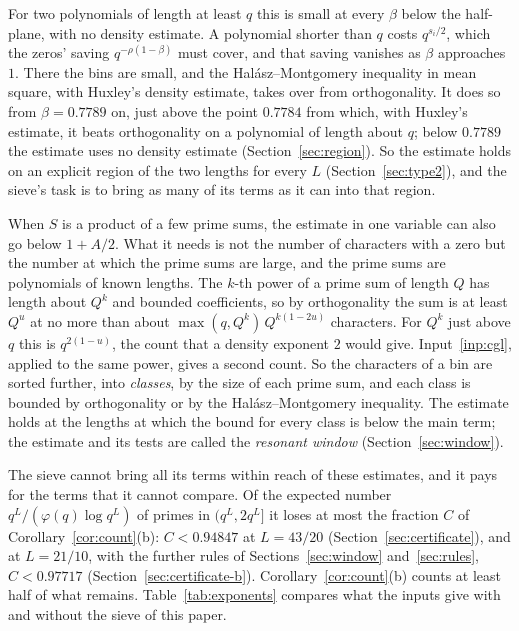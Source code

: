 \documentclass[11pt]{article}
\theoremstyle{definition}
\begin{document}
For two polynomials of length at least $q$ this is small at every $\beta$ below the half-plane, with no density
estimate. A polynomial shorter than $q$ costs $q^{s_i/2}$, which the zeros' saving $q^{-\rho(1 - \beta)}$ must cover,
and that saving vanishes as $\beta$ approaches $1$. There the bins are small, and the Hal\'asz--Montgomery inequality
in mean square, with Huxley's density estimate, takes over from orthogonality. It does so from $\beta = 0.7789$ on, just
above the point $0.7784$ from which, with Huxley's estimate, it beats orthogonality on a polynomial of length about
$q$; below $0.7789$ the estimate uses no density estimate (Section~\ref{sec:region}).
So the estimate holds on an explicit region of the two lengths for every $L$ (Section~\ref{sec:type2}), and the
sieve's task is to bring as many of its terms as it can into that region.

When $S$ is a product of a few prime sums, the estimate in one variable can also go below $1 + A/2$. What it needs is
not the number of characters with a zero but the number at which the prime sums are large, and the prime sums are
polynomials of known lengths. The $k$-th power of a prime sum of length $Q$ has length about $Q^k$ and bounded
coefficients, so by orthogonality the sum is at least $Q^u$ at no more than about $\max(q, Q^k)\, Q^{k(1 - 2u)}$
characters. For $Q^k$ just above $q$ this is $q^{2(1 - u)}$, the count that a density exponent $2$ would give.
Input~\ref{inp:cgl}, applied to the same power, gives a second count. So the characters of a bin are sorted further,
into \emph{classes}, by the size of each prime sum, and each class is bounded by orthogonality or by the
Hal\'asz--Montgomery inequality. The estimate holds at the lengths at which the bound for every class is below the main
term; the estimate and its tests are called the \emph{resonant window} (Section~\ref{sec:window}).

The sieve cannot bring all its terms within reach of these estimates, and it pays for the terms that it cannot
compare. Of the
expected number $q^L/(\varphi(q) \log q^L)$ of primes in $(q^L, 2q^L]$ it loses at most the fraction $C$ of
Corollary~\ref{cor:count}(b): $C < 0.94847$ at $L = 43/20$ (Section~\ref{sec:certificate}), and at $L = 21/10$, with the
further rules of Sections~\ref{sec:window} and~\ref{sec:rules}, $C < 0.97717$ (Section~\ref{sec:certificate-b}).
Corollary~\ref{cor:count}(b) counts at least half of what remains. Table~\ref{tab:exponents} compares what the inputs
give with and without the sieve of this paper.
\end{document}
